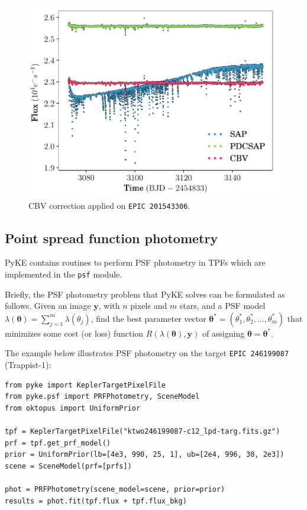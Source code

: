 \documentclass{article}
\begin{document}
\begin{figure}[!htb]
    \centering
    \includegraphics[scale=.5]{figs/cbv-k2.pdf}
    \caption{CBV correction applied on \texttt{EPIC 201543306}.}
    \label{fig:cbv-correction-k2}
\end{figure}

\subsection{Point spread function photometry}

PyKE contains routines to perform PSF photometry in TPFs
which are implemented in the \texttt{psf} module.

Briefly, the PSF photometry problem that PyKE solves can be formulated as
follows. Given an image $\bm{y}$, with $n$ pixels and $m$ stars, and a PSF model
$\lambda(\bm{\theta}) = \sum_{j=1}^{m} \lambda({\theta}_j)$,
find the best parameter vector
$\bm{\theta}^{*} = (\theta_1^{*}, \theta_2^{*}, ..., \theta_m^{*})$
that minimizes some cost (or loss) function $R(\lambda(\bm{\theta}), \bm{y})$
of assigning $\bm{\theta} = \bm{\theta}^{*}$.

The example below illustrates PSF photometry on the target \texttt{EPIC 246199087}
(Trappist-1):

\begin{verbatim}
from pyke import KeplerTargetPixelFile
from pyke.psf import PRFPhotometry, SceneModel
from oktopus import UniformPrior

tpf = KeplerTargetPixelFile("ktwo246199087-c12_lpd-targ.fits.gz")
prf = tpf.get_prf_model()
prior = UniformPrior(lb=[4e3, 990, 25, 1], ub=[2e4, 996, 30, 2e3])
scene = SceneModel(prf=[prfs])

phot = PRFPhotometry(scene_model=scene, prior=prior)
results = phot.fit(tpf.flux + tpf.flux_bkg)
\end{verbatim}
\end{document}
